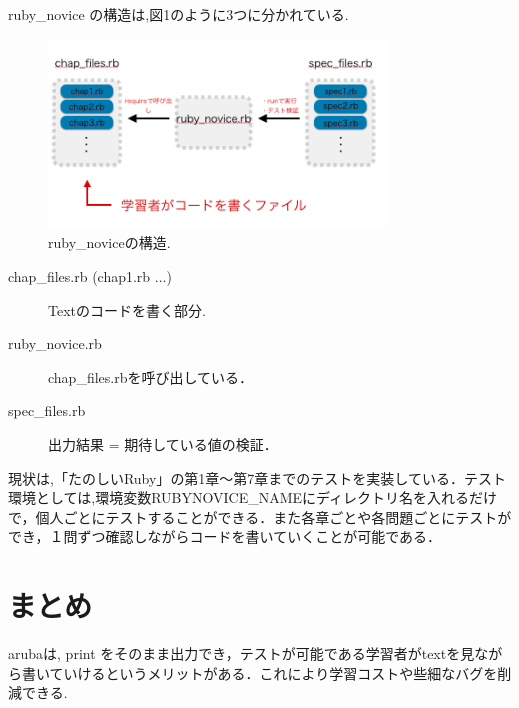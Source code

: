 \documentclass[10pt,a4j,twocolumn]{jsarticle}
\begin{document}

ruby\_novice の構造は,図1のように3つに分かれている.
\begin{figure}[H]
\begin{center}
     \includegraphics[width=9cm, bb=0 0 644 342]{abst.jpg}
     \caption{ruby\_noviceの構造.}
\end{center}
\end{figure}

\begin{description}
\item[chap\_files.rb (chap1.rb ...)]Textのコードを書く部分.
\item[ruby\_novice.rb] chap\_files.rbを呼び出している．
\item[spec\_files.rb]出力結果 = 期待している値の検証．
\end{description}

現状は,「たのしいRuby」\cite{HappyRuby}の第1章〜第7章までのテストを実装している．テスト環境としては,環境変数RUBYNOVICE\_NAMEにディレクトリ名を入れるだけで，個人ごとにテストすることができる．また各章ごとや各問題ごとにテストができ，１問ずつ確認しながらコードを書いていくことが可能である．

\section{まとめ}
arubaは, print をそのまま出力でき，テストが可能である学習者がtextを見ながら書いていけるというメリットがある．これにより学習コストや些細なバグを削減できる.
\end{document}
